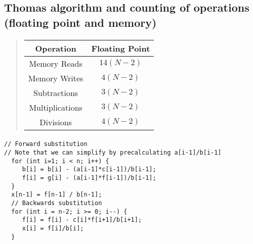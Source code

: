 \documentclass[%
oneside,                 %
final,                   %
10pt]{article}
\begin{document}
\subsection*{Thomas algorithm and counting of operations (floating point and memory)}

\paragraph{}


\begin{quote}
\begin{tabular}{cc}
\hline
\multicolumn{1}{c}{ Operation } & \multicolumn{1}{c}{ Floating Point } \\
\hline
Memory Reads    & $14(N-2)$      \\
Memory Writes   & $4(N-2)$       \\
Subtractions    & $3(N-2)$       \\
Multiplications & $3(N-2)$       \\
Divisions       & $4(N-2)$       \\
\hline
\end{tabular}
\end{quote}

\noindent




\paragraph{}













\begin{verbatim}
// Forward substitution    
// Note that we can simplify by precalculating a[i-1]/b[i-1]
  for (int i=1; i < n; i++) {
     b[i] = b[i] - (a[i-1]*c[i-1])/b[i-1];
     f[i] = g[i] - (a[i-1]*f[i-1])/b[i-1];
  }
  x[n-1] = f[n-1] / b[n-1];
  // Backwards substitution                                                           
  for (int i = n-2; i >= 0; i--) {
     f[i] = f[i] - c[i]*f[i+1]/b[i+1];
     x[i] = f[i]/b[i];
  }

\end{verbatim}
\end{document}
